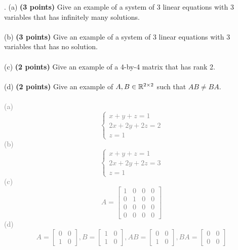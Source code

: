 \documentclass[12pt,a4paper]{article}
\newcommand{\gray}[1]{\textcolor{gray}{#1}}
\renewcommand{\l}{\left}
\renewcommand{\r}{\right}
\newcommand{\x}{\times}
\def\R{\ifmmode\mathbb R\fi}
\begin{document}
\newpage
{}. (a) \textbf{(3 points)} Give an example of a system of 3 linear equations with 3 variables that has infinitely many solutions. \\
\\
(b) \textbf{(3 points)} Give an example of a system of 3 linear equations with 3 variables that has no solution. \\
\\
(c) \textbf{(2 points)} Give an example of a 4-by-4 matrix that has rank 2. \\
\\
(d) \textbf{(2 points)} Give an example of $A, B \in \R^{2\x 2}$ such that $AB \neq BA$. \\
\\
\gray{
    (a)
\begin{equation*}
	\l\{
	\begin{array}{l}
	    x+y+z = 1\\
	    2x+2y+2z = 2\\
	    z=1
	\end{array}
	\r.
\end{equation*}
(b)
\begin{equation*}
	\l\{
	\begin{array}{l}
	    x+y+z = 1\\
	    2x+2y+2z = 3\\
	    z=1
	\end{array}
	\r.
\end{equation*}
(c) 
	\begin{equation*}
	A = \l[
	\begin{array}{cccc}
	    1 & 0 & 0 & 0 \\
	    0 & 1 & 0 & 0 \\
	    0 & 0 & 0 & 0\\
	    0 & 0 & 0 & 0
	\end{array}
	\r]
	\end{equation*}
(d)
	\begin{equation*}
	A = \l[
	\begin{array}{cc}
	    0 & 0 \\
	    1 & 0
	\end{array}
	\r], 
	B = \l[
	\begin{array}{cc}
	    1 & 0 \\
	    1 & 0
	\end{array}
	\r],
	AB = \l[
	\begin{array}{cc}
	    0 & 0 \\
	    1 & 0
	\end{array}
	\r],
	BA = \l[
	\begin{array}{cc}
	    0 & 0 \\
	    0 & 0
	\end{array}
	\r]
	\end{equation*}
}
\end{document}
